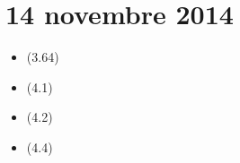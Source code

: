 \section{14 novembre 2014}

\begin{itemize}
    \item (3.64)
    \item (4.1)
    \item (4.2)
    \item (4.4)
\end{itemize}